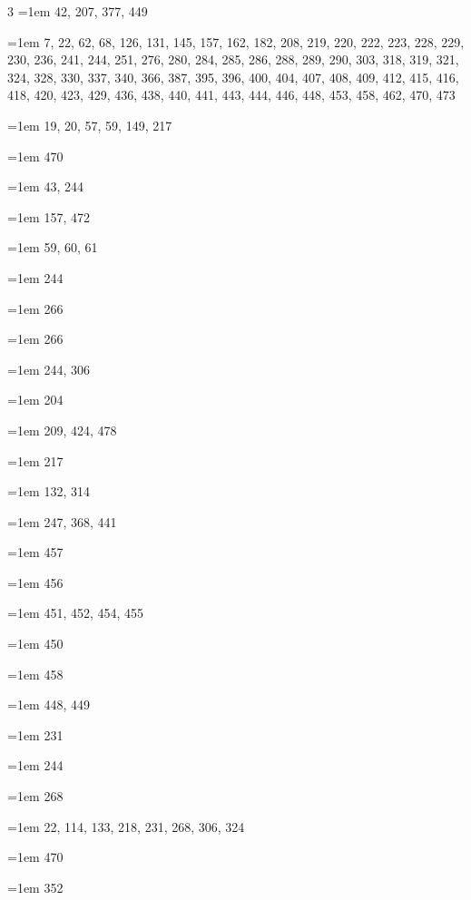 \begin{multicols}{3}
\hangindent=1em  42, 207, 377, 449\par
\hangindent=1em  7, 22, 62, 68, 126, 131, 145, 157, 162, 182, 208, 219, 220, 222, 223, 228, 229, 230, 236, 241, 244, 251, 276, 280, 284, 285, 286, 288, 289, 290, 303, 318, 319, 321, 324, 328, 330, 337, 340, 366, 387, 395, 396, 400, 404, 407, 408, 409, 412, 415, 416, 418, 420, 423, 429, 436, 438, 440, 441, 443, 444, 446, 448, 453, 458, 462, 470, 473\par
\hangindent=1em  19, 20, 57, 59, 149, 217\par
\hangindent=1em  470\par
\hangindent=1em  43, 244\par
\hangindent=1em  157, 472\par
\hangindent=1em  59, 60, 61\par
\hangindent=1em  244\par
\hangindent=1em  266\par
\hangindent=1em  266\par
\hangindent=1em  244, 306\par
\hangindent=1em  204\par
\hangindent=1em  209, 424, 478\par
\hangindent=1em  217\par
\hangindent=1em  132, 314\par
\hangindent=1em  247, 368, 441\par
\hangindent=1em  457\par
\hangindent=1em  456\par
\hangindent=1em  451, 452, 454, 455\par
\hangindent=1em  450\par
\hangindent=1em  458\par
\hangindent=1em  448, 449\par
\hangindent=1em  231\par
\hangindent=1em  244\par
\hangindent=1em  268\par
\hangindent=1em  22, 114, 133, 218, 231, 268, 306, 324\par
\hangindent=1em  470\par
\hangindent=1em  352\par

\end{multicols}
